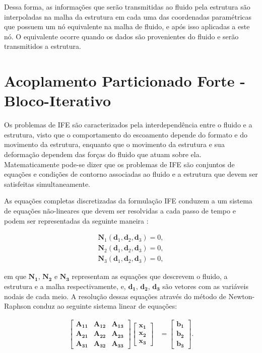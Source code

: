 \documentclass[tese_patricia]{subfiles}
\begin{document}
Dessa forma, as informações que serão transmitidas ao fluido pela estrutura são interpoladas na malha da estrutura em cada uma das coordenadas paramétricas que possuem um nó equivalente na malha de fluido, e após isso aplicadas a este nó. O equivalente ocorre quando os dados são provenientes do fluido e serão transmitidos a estrutura.


\section{Acoplamento Particionado Forte - Bloco-Iterativo}

Os problemas de IFE são caracterizados pela interdependência entre o fluido e a estrutura, visto que o comportamento do escoamento depende do formato e do movimento da estrutura, enquanto que o movimento da estrutura e sua deformação dependem das forças do fluido que atuam sobre ela. Matematicamente pode-se dizer que os problemas de IFE são conjuntos de equações e condições de contorno associadas ao fluido e a estrutura que devem ser satisfeitas simultaneamente.

As equações completas discretizadas da formulação IFE conduzem a um sistema de equações não-lineares que devem ser resolvidas a cada passo de tempo e podem ser representadas da seguinte maneira \cite{BazilevsTT:2013}:

\begin{align}
	\mathbf{N}_{1}\left(\mathbf{d}_{1},\mathbf{d}_{2},\mathbf{d}_{3}\right) = 0, \label{eq:N1}\\ 
	\mathbf{N}_{2}\left(\mathbf{d}_{1},\mathbf{d}_{2},\mathbf{d}_{3}\right) = 0,\label{eq:N2}\\
	\mathbf{N}_{3}\left(\mathbf{d}_{1},\mathbf{d}_{2},\mathbf{d}_{3}\right) = 0 \label{eq:N3},
\end{align}

\noindent em que $\mathbf{{N}_{1}}$, $\mathbf{{N}_{2}}$ e $\mathbf{{N}_{3}}$ representam as equações que descrevem o fluido, a estrutura e a malha respectivamente, e, $\mathbf{{d}_{1}}$, $\mathbf{{d}_{2}}$, $\mathbf{{d}_{3}}$ são vetores com as variáveis nodais de cada meio. 
A resolução dessas equações através do método de Newton-Raphson conduz ao seguinte sistema linear de equações:

\begin{align}
	\begin{bmatrix}
		\mathbf{A_{11}} & \mathbf{A_{12}} & \mathbf{A_{13}} \\
		\mathbf{A_{21}} & \mathbf{A_{22}} & \mathbf{A_{23}} \\
		\mathbf{A_{31}} & \mathbf{A_{32}} & \mathbf{A_{33}} 
	\end{bmatrix}
	\begin{bmatrix}
		\mathbf{x_{1}} \\
		\mathbf{x_{2}} \\
		\mathbf{x_{3}}
	\end{bmatrix}
	&=
	\begin{bmatrix}
		\mathbf{b_{1}} \\
		\mathbf{b_{2}} \\
		\mathbf{b_{3}}
	\end{bmatrix}.
	\label{eq:SistLinear}
\end{align}	
\end{document}

